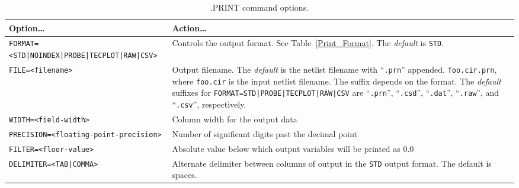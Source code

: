 \begin{table}[!htb]
  \caption[.PRINT command options.]{.PRINT command options.}
\label{Print_Commands}
  \begin{tabularx}{\linewidth}{|>{\setlength{\hsize}{1.0\hsize}}Y|
      >{\setlength{\hsize}{1.0\hsize}}Y|}
     \color{white}\bf Option\ldots &
    \color{white}\bf Action\ldots \\ \hline

    \texttt{FORMAT=}\newline \texttt{<STD|NOINDEX|PROBE|TECPLOT|RAW|CSV>} &
    Controls the output format.  See Table~\ref{Print_Format}.  The {\em
      default} is \texttt{STD}. \\ \hline

    \texttt{FILE=<filename>} & Output filename. The {\em default} is the
    netlist filename with ``\texttt{.prn}'' appended. \newline 
    \texttt{foo.cir.prn}, where \texttt{foo.cir} is the input netlist
  filename. The suffix depends on the format.  The {\em default} suffixes for \texttt{FORMAT=STD|PROBE|TECPLOT|RAW|CSV} 
  are ``\texttt{.prn}'', ``\texttt{.csd}'', ``\texttt{.dat}'', ``\texttt{.raw}'', and ``\texttt{.csv}'', respectively.  \\ \hline

    \texttt{WIDTH=<field-width>} & Column width for the output data \\ \hline

    \texttt{PRECISION=<floating-point-precision>} & Number of
    significant digits past the decimal point \\ \hline

    \texttt{FILTER=<floor-value>} & Absolute value below which output
    variables will be printed as 0.0 \\ \hline

    \texttt{DELIMITER=<TAB|COMMA>} & Alternate delimiter between columns
    of output in the \texttt{STD} output format. The default is spaces.\\ \hline

  \end{tabularx}

\end{table}

